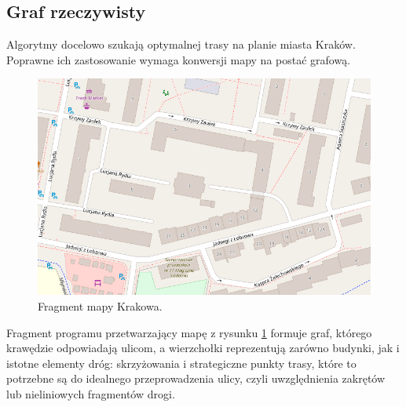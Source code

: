 \documentclass[a4paper, 12pt, twoside, openright]{article}
\begin{document}
\subsection{Graf rzeczywisty}\label{grafRzecz}
\indent\par
Algorytmy docelowo szukają optymalnej trasy na planie miasta Kraków. Poprawne ich zastosowanie wymaga konwersji mapy na postać grafową. 

\begin{figure}[H]
	\centering
	\includegraphics[width=1\textwidth]{img/grafRzecz/osm1}
	\caption[]{Fragment mapy Krakowa\footnotemark.}
	\label{osm1}
\end{figure}


Fragment programu przetwarzający mapę z rysunku \ref{osm1} formuje graf, którego krawędzie odpowiadają ulicom, a wierzchołki reprezentują zarówno budynki, jak i istotne elementy dróg: skrzyżowania i strategiczne punkty trasy, które to potrzebne są do idealnego przeprowadzenia ulicy, czyli uwzględnienia zakrętów lub nieliniowych fragmentów drogi.
\end{document}
